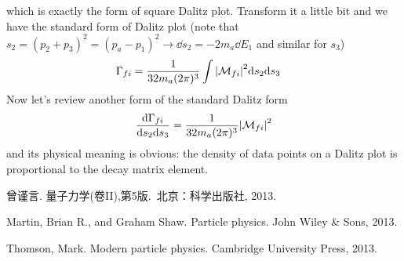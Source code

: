 \documentclass{article}
\begin{document}
which is exactly the form of square Dalitz plot. Transform it a little bit and we have the standard form of Dalitz plot (note that $s_2=(p_2+p_3)^2=(p_a-p_1)^2\rightarrow\dd s_2=-2m_a\dd E_1$ and similar for $s_3$)
\begin{align*}
  \Gamma_{fi}&=\frac{1}{32m_a(2\pi)^3}\int\abs{\mathcal{M}_{fi}}^2\dd s_2\dd s_3
\end{align*}
Now let's review another form of the standard Dalitz form
\begin{align*}
  \frac{\dd\Gamma_{fi}}{\dd s_2\dd s_3}=\frac{1}{32m_a(2\pi)^3}\abs{\mathcal{M}_{fi}}^2
\end{align*}
and its physical meaning is obvious: the density of data points on a Dalitz plot is proportional to the decay matrix element.


\begin{thebibliography}{b}
  曾谨言. 量子力学(卷II),第5版.\ 北京：科学出版社, 2013.

  Martin, Brian R., and Graham Shaw. Particle physics. John Wiley \& Sons, 2013.


  Thomson, Mark. Modern particle physics. Cambridge University Press, 2013.
\end{thebibliography}
\end{document}
